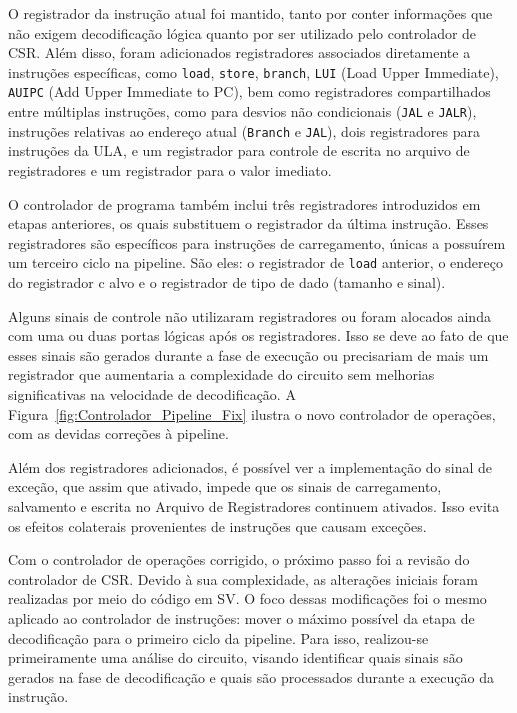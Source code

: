 \documentclass[
	12pt,				%
	openright,			%
	oneside,			%
	a4paper,			%
	english,			%
	french,				%
	spanish,			%
	brazil,				%
	]{abntex2}
\begin{document}
O registrador da instrução atual foi mantido, tanto por conter informações que não exigem decodificação lógica quanto por ser utilizado pelo controlador de CSR. Além disso, foram adicionados registradores associados diretamente a instruções específicas, como \texttt{load}, \texttt{store}, \texttt{branch}, \texttt{LUI} (Load Upper Immediate), \texttt{AUIPC} (Add Upper Immediate to PC), bem como registradores compartilhados entre múltiplas instruções, como para desvios não condicionais (\texttt{JAL} e \texttt{JALR}), instruções relativas ao endereço atual (\texttt{Branch} e \texttt{JAL}), dois registradores para instruções da ULA, e um registrador para controle de escrita no arquivo de registradores e um registrador para o valor imediato.

O controlador de programa também inclui três registradores introduzidos em etapas anteriores, os quais substituem o registrador da última instrução. Esses registradores são específicos para instruções de carregamento, únicas a possuírem um terceiro ciclo na pipeline. São eles: o registrador de \texttt{load} anterior, o endereço do registrador c alvo e o registrador de tipo de dado (tamanho e sinal).

Alguns sinais de controle não utilizaram registradores ou foram alocados ainda com uma ou duas portas lógicas após os registradores. Isso se deve ao fato de que esses sinais são gerados durante a fase de execução ou precisariam de mais um registrador que aumentaria a complexidade do circuito sem melhorias significativas na velocidade de decodificação. A Figura~\ref{fig:Controlador_Pipeline_Fix} ilustra o novo controlador de operações, com as devidas correções à pipeline.

Além dos registradores adicionados, é possível ver a implementação do sinal de exceção, que assim que ativado, impede que os sinais de carregamento, salvamento e escrita no Arquivo de Registradores continuem ativados. Isso evita os efeitos colaterais provenientes de instruções que causam exceções.

Com o controlador de operações corrigido, o próximo passo foi a revisão do controlador de CSR. Devido à sua complexidade, as alterações iniciais foram realizadas por meio do código em SV. O foco dessas modificações foi o mesmo aplicado ao controlador de instruções: mover o máximo possível da etapa de decodificação para o primeiro ciclo da pipeline. Para isso, realizou-se primeiramente uma análise do circuito, visando identificar quais sinais são gerados na fase de decodificação e quais são processados durante a execução da instrução.
\end{document}
